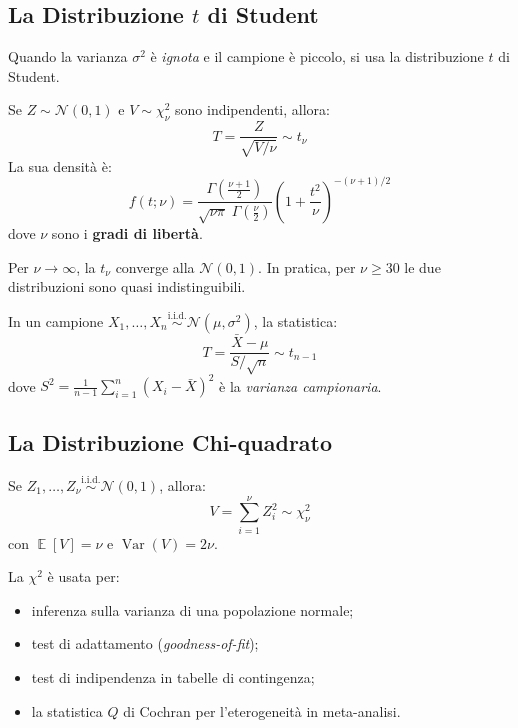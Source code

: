 \documentclass[12pt, a4paper]{article}
\DeclareMathOperator{\Var}{Var}
\DeclareMathOperator{\E}{\mathbb{E}}
\newcommand{\N}{\mathcal{N}}
\newcommand{\iid}{\overset{\text{i.i.d.}}{\sim}}
\begin{document}
\subsection{La Distribuzione $t$ di Student}

Quando la varianza $\sigma^2$ è \emph{ignota} e il campione è piccolo,
si usa la distribuzione $t$ di Student.

\begin{definizione}
  Se $Z \sim \N(0,1)$ e $V \sim \chi^2_\nu$ sono indipendenti, allora:
  \[
    T = \frac{Z}{\sqrt{V/\nu}} \sim t_\nu
  \]
  La sua densità è:
  \[
    f(t; \nu) =
      \frac{\Gamma\!\left(\tfrac{\nu+1}{2}\right)}
           {\sqrt{\nu\pi}\;\Gamma\!\left(\tfrac{\nu}{2}\right)}
      \left(1 + \frac{t^2}{\nu}\right)^{-(\nu+1)/2}
  \]
  dove $\nu$ sono i \textbf{gradi di libertà}.
\end{definizione}

\begin{proprieta}
  Per $\nu \to \infty$, la $t_\nu$ converge alla $\N(0,1)$.
  In pratica, per $\nu \ge 30$ le due distribuzioni sono quasi
  indistinguibili.
\end{proprieta}

In un campione $X_1, \ldots, X_n \iid \N(\mu, \sigma^2)$, la statistica:
\[
  T = \frac{\bar{X} - \mu}{S/\sqrt{n}} \sim t_{n-1}
\]
dove $S^2 = \frac{1}{n-1}\sum_{i=1}^n (X_i - \bar{X})^2$ è la
\emph{varianza campionaria}.

\subsection{La Distribuzione Chi-quadrato}

\begin{definizione}
  Se $Z_1, \ldots, Z_\nu \iid \N(0,1)$, allora:
  \[
    V = \sum_{i=1}^{\nu} Z_i^2 \sim \chi^2_\nu
  \]
  con $\E[V] = \nu$ e $\Var(V) = 2\nu$.
\end{definizione}

La $\chi^2$ è usata per:
\begin{itemize}
  \item inferenza sulla varianza di una popolazione normale;
  \item test di adattamento (\emph{goodness-of-fit});
  \item test di indipendenza in tabelle di contingenza;
  \item la statistica $Q$ di Cochran per l'eterogeneità in meta-analisi.
\end{itemize}
\end{document}
